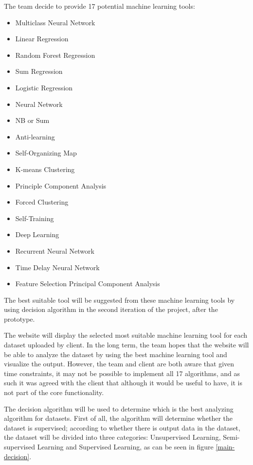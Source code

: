 \documentclass[titlepage]{article}
\begin{document}
The team decide to provide 17 potential machine learning tools:
\begin{itemize}
  \item Multiclass Neural Network
  \item Linear Regression
  \item Random Forest Regression
  \item Sum Regression
  \item Logistic Regression
  \item Neural Network
  \item NB or Sum
  \item Anti-learning
  \item Self-Organizing Map
  \item K-means Clustering
  \item Principle Component Analysis
  \item Forced Clustering
  \item Self-Training
  \item Deep Learning
  \item Recurrent Neural Network
  \item Time Delay Neural Network
  \item Feature Selection Principal Component Analysis
\end{itemize}
The best suitable tool will be suggested from these machine learning tools by using decision algorithm in the second iteration of the project, after the prototype.

The website will display the selected most suitable machine learning tool for each dataset uploaded by client. In the long term, the team hopes that the website will be able to analyze the dataset by using the best machine learning tool and visualize the output. However, the team and client are both aware that given time constraints, it may not be possible to implement all 17 algorithms, and as such it was agreed with the client that although it would be useful to have, it is not part of the core functionality.

The decision algorithm will be used to determine which is the best analyzing algorithm for datasets. First of all, the algorithm will determine whether the dataset is supervised; according to whether there is output data in the dataset, the dataset will be divided into three categories: Unsupervised Learning, Semi-supervised Learning and Supervised Learning, as can be seen in figure \ref{main-decision}.
\end{document}
